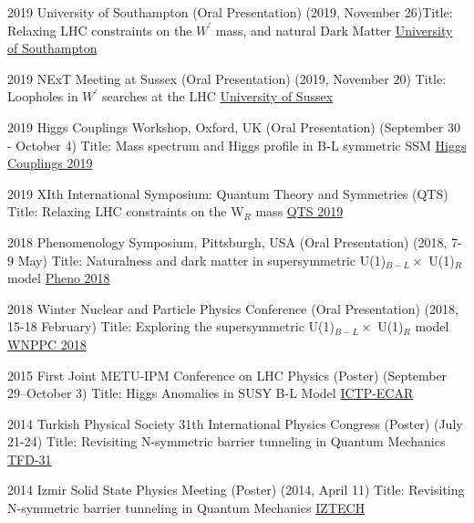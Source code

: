 \documentclass[]{friggeri-cv}
\begin{document}
\begin{entrylist}
	
	\entrySuperLong
	{2019}
	{University of Southampton \normalfont (Oral Presentation) (2019, November 26)}{Title: Relaxing LHC constraints on the $W^\prime$ mass, and natural Dark Matter} 
	{\href{https://www.hep.phys.soton.ac.uk/content/Tuesday-2019-11-26-Ozer-Ozdal}{University of Southampton}} 	
	
	\entrySuperLong
	{2019}
	{NExT Meeting at Sussex \normalfont (Oral Presentation) (2019, November 20)}
	{Title: Loopholes in $W^\prime$ searches at the LHC}
	{\href{https://indico.cern.ch/event/857401/overview}{University of Sussex}} 		
	
	\entrySuperLong
	{2019}
	{Higgs Couplings Workshop, Oxford, UK \normalfont (Oral Presentation) (September 30 - October 4)}
	{Title: Mass spectrum and Higgs profile in B-L symmetric SSM}
	{\href{https://indico.cern.ch/event/796574/contributions/3521711/}{Higgs Couplings 2019}} 	
		
	\entrySuperLong
	{2019}
	{XIth International Symposium: Quantum Theory and Symmetries (QTS)}
	{Title: Relaxing LHC constraints on the W$_R$ mass}
	{\href{http://www.crm.umontreal.ca/2019/QTS2019/pdf/ozdal.pdf}{QTS 2019}} 
	
	\entrySuperLong
	{2018}
	{Phenomenology Symposium, Pittsburgh, USA  \normalfont (Oral Presentation) (2018, 7-9 May)}
	{Title: Naturalness and dark matter in supersymmetric U(1)$_{B-L} \times$ U(1)$_R$ model}
	{\href{https://indico.cern.ch/event/699148/}{Pheno 2018}} 
	
	\entrySuperLong
	{2018}
	{Winter Nuclear and Particle Physics Conference  \normalfont (Oral Presentation) (2018, 15-18 February)}
	{Title: Exploring the supersymmetric U(1)$_{B-L} \times$ U(1)$_R$ model}
	{\href{http://wnppc.triumf.ca/2018/}{WNPPC 2018}}
	
	\entrySuperLong
	{2015}
	{First Joint METU-IPM Conference on LHC Physics  \normalfont (Poster) (September 29--October 3)}
	{Title: Higgs Anomalies in SUSY B-L Model}
	{\href{http://ictp-ecar.org/events/first-joint-metu-ipm-conference-on-lhc-physics/}{ICTP-ECAR}}
	
	\entrySuperLong
	{2014}
	{Turkish Physical Society 31th International Physics Congress \normalfont (Poster) (July 21-24)}
	{Title: Revisiting N-symmetric barrier tunneling in Quantum Mechanics}
	{\href{http://www.tfd.com.tr/arsiv/TFD/31/en/default.htm}{TFD-31}}
	
	\entrySuperLong
	{2014}
	{Izmir Solid State Physics Meeting  \normalfont (Poster) (2014, April 11)}
	{Title: Revisiting N-symmetric barrier tunneling in Quantum Mechanics}
	{\href{http://ymf.iyte.edu.tr/?page_id=234}{IZTECH}}
	
	
\end{entrylist}
\end{document}
